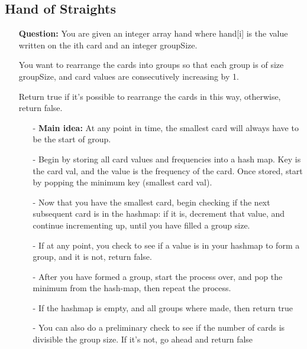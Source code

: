 \documentclass[12pt]{article}
\begin{document}
\subsection{Hand of Straights}
\begin{enumerate}
  \item[] \textbf{Question:} You are given an integer array hand where hand[i] is the value written on the ith card and an integer groupSize.

You want to rearrange the cards into groups so that each group is of size groupSize, and card values are consecutively increasing by 1.

Return true if it's possible to rearrange the cards in this way, otherwise, return false.

    \begin{enumerate}
      \item[-] \textbf{Main idea:} At any point in time, the smallest card will always have to be the start of group.
      \item[-] Begin by storing all card values and frequencies into a hash map. Key is the card val, and the value is the frequency of the card. Once stored, start by popping the minimum key (smallest card val). 
      \item[-] Now that you have the smallest card, begin checking if the next subsequent card is in the hashmap: if it is, decrement that value, and continue incrementing up, until you have filled a group size. 
      \item[-] If at any point, you check to see if a value is in your hashmap to form a group, and it is not, return false.
      \item[-] After you have formed a group, start the process over, and pop the minimum from the hash-map, then repeat the process.
      \item[-] If the hashmap is empty, and all groups where made, then return true
      \item[-] You can also do a preliminary check to see if the number of cards is divisible the group size. If it's not, go ahead and return false
    \end{enumerate}
\end{enumerate}
\end{document}
